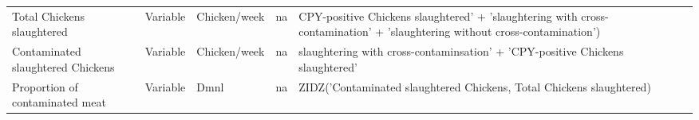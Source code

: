 \begin{landscape}
\begin{longtable}[c]{m{10em}lllm{15em}lll}
Total Chickens slaughtered                    & Variable & Chicken/week             & na                        & CPY-positive Chickens slaughtered' + 'slaughtering with cross-contamination' + 'slaughtering without cross-contamination')                                                                                                                                                               &                                                                                                                                                                                              &                                                                                                                                                                                                                                       \\
Contaminated slaughtered Chickens             & Variable & Chicken/week             & na                        & slaughtering with cross-contaminsation' + 'CPY-positive Chickens slaughtered'                                                                                                                                                                                                            &                                                                                                                                                                                              &                                                                                                                                                                                                                                       \\
Proportion of contaminated meat               & Variable & Dmnl                     & na                        & ZIDZ('Contaminated slaughtered Chickens, Total Chickens slaughtered)                                                                                                                                                                                                                     &                                                                                                                                                                                              &                                                                                                                                                                                                                                       \\

\end{longtable}
\end{landscape}

